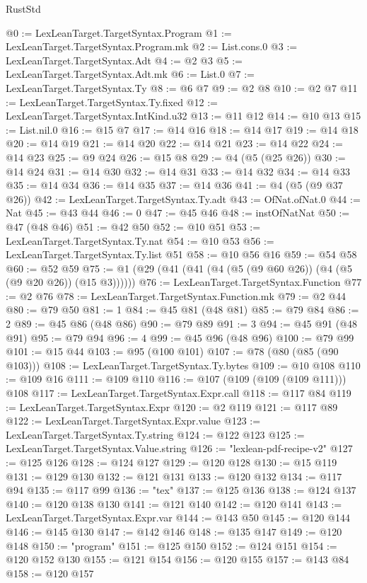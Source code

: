 \begin{lexlean}{RustStd}
\begin{coremodule}
@0 := LexLeanTarget.TargetSyntax.Program
@1 := LexLeanTarget.TargetSyntax.Program.mk
@2 := List.cons.{0}
@3 := LexLeanTarget.TargetSyntax.Adt
@4 := @2 @3
@5 := LexLeanTarget.TargetSyntax.Adt.mk
@6 := List.{0}
@7 := LexLeanTarget.TargetSyntax.Ty
@8 := @6 @7
@9 := @2 @8
@10 := @2 @7
@11 := LexLeanTarget.TargetSyntax.Ty.fixed
@12 := LexLeanTarget.TargetSyntax.IntKind.u32
@13 := @11 @12
@14 := @10 @13
@15 := List.nil.{0}
@16 := @15 @7
@17 := @14 @16
@18 := @14 @17
@19 := @14 @18
@20 := @14 @19
@21 := @14 @20
@22 := @14 @21
@23 := @14 @22
@24 := @14 @23
@25 := @9 @24
@26 := @15 @8
@29 := @4 (@5 (@25 @26))
@30 := @14 @24
@31 := @14 @30
@32 := @14 @31
@33 := @14 @32
@34 := @14 @33
@35 := @14 @34
@36 := @14 @35
@37 := @14 @36
@41 := @4 (@5 (@9 @37 @26))
@42 := LexLeanTarget.TargetSyntax.Ty.adt
@43 := OfNat.ofNat.{0}
@44 := Nat
@45 := @43 @44
@46 := 0
@47 := @45 @46
@48 := instOfNatNat
@50 := @47 (@48 @46)
@51 := @42 @50
@52 := @10 @51
@53 := LexLeanTarget.TargetSyntax.Ty.nat
@54 := @10 @53
@56 := LexLeanTarget.TargetSyntax.Ty.list @51
@58 := @10 @56 @16
@59 := @54 @58
@60 := @52 @59
@75 := @1 (@29 (@41 (@41 (@4 (@5 (@9 @60 @26)) (@4 (@5 (@9 @20 @26)) (@15 @3))))))
@76 := LexLeanTarget.TargetSyntax.Function
@77 := @2 @76
@78 := LexLeanTarget.TargetSyntax.Function.mk
@79 := @2 @44
@80 := @79 @50
@81 := 1
@84 := @45 @81 (@48 @81)
@85 := @79 @84
@86 := 2
@89 := @45 @86 (@48 @86)
@90 := @79 @89
@91 := 3
@94 := @45 @91 (@48 @91)
@95 := @79 @94
@96 := 4
@99 := @45 @96 (@48 @96)
@100 := @79 @99
@101 := @15 @44
@103 := @95 (@100 @101)
@107 := @78 (@80 (@85 (@90 @103)))
@108 := LexLeanTarget.TargetSyntax.Ty.bytes
@109 := @10 @108
@110 := @109 @16
@111 := @109 @110
@116 := @107 (@109 (@109 (@109 @111))) @108
@117 := LexLeanTarget.TargetSyntax.Expr.call
@118 := @117 @84
@119 := LexLeanTarget.TargetSyntax.Expr
@120 := @2 @119
@121 := @117 @89
@122 := LexLeanTarget.TargetSyntax.Expr.value
@123 := LexLeanTarget.TargetSyntax.Ty.string
@124 := @122 @123
@125 := LexLeanTarget.TargetSyntax.Value.string
@126 := "lexlean-pdf-recipe-v2"
@127 := @125 @126
@128 := @124 @127
@129 := @120 @128
@130 := @15 @119
@131 := @129 @130
@132 := @121 @131
@133 := @120 @132
@134 := @117 @94
@135 := @117 @99
@136 := "tex"
@137 := @125 @136
@138 := @124 @137
@140 := @120 @138 @130
@141 := @121 @140
@142 := @120 @141
@143 := LexLeanTarget.TargetSyntax.Expr.var
@144 := @143 @50
@145 := @120 @144
@146 := @145 @130
@147 := @142 @146
@148 := @135 @147
@149 := @120 @148
@150 := "program"
@151 := @125 @150
@152 := @124 @151
@154 := @120 @152 @130
@155 := @121 @154
@156 := @120 @155
@157 := @143 @84
@158 := @120 @157

\end{coremodule}
\end{lexlean}
